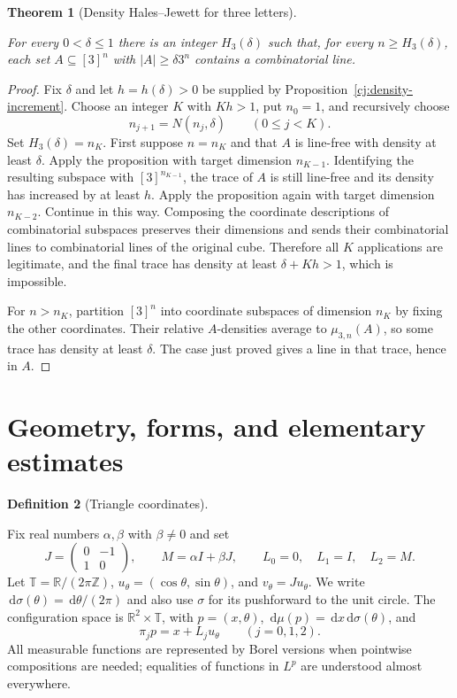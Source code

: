 \documentclass[11pt]{amsart}
\newcommand{\R}{\mathbb R}
\newcommand{\Z}{\mathbb Z}
\newcommand{\dd}{\,\mathrm d}
\newtheorem{theorem}{Theorem}[section]
\theoremstyle{definition}
\newtheorem{definition}[theorem]{Definition}
\theoremstyle{remark}
\numberwithin{equation}{section}
\providecommand{\lean}[1]{}
\providecommand{\leanok}{}
\begin{document}
\begin{theorem}[Density Hales--Jewett for three letters]\label{cj:dhj3}
\lean{Auto.cj_dhj3}
\leanok
For every $0<\delta\le1$ there is an integer $H_3(\delta)$ such
that, for every $n\ge H_3(\delta)$, each set $A\subseteq[3]^n$
with $|A|\ge\delta3^n$ contains a combinatorial line.
\end{theorem}
\begin{proof}
Fix $\delta$ and let $h=h(\delta)>0$ be supplied by
Proposition~\ref{cj:density-increment}.  Choose an integer $K$
with $Kh>1$, put $n_0=1$, and recursively choose
\[
 n_{j+1}=N(n_j,\delta)\qquad(0\le j<K).
\]
Set $H_3(\delta)=n_K$.  First suppose $n=n_K$ and that $A$ is
line-free with density at least $\delta$.  Apply the proposition
with target dimension $n_{K-1}$.  Identifying the resulting
subspace with $[3]^{n_{K-1}}$, the trace of $A$ is still line-free
and its density has increased by at least $h$.  Apply the
proposition again with target dimension $n_{K-2}$.  Continue in
this way.  Composing the coordinate descriptions of combinatorial
subspaces preserves their dimensions and sends their combinatorial
lines to combinatorial lines of the original cube.  Therefore all
$K$ applications are legitimate, and the final trace has density
at least $\delta+Kh>1$, which is impossible.

For $n>n_K$, partition $[3]^n$ into coordinate subspaces of
dimension $n_K$ by fixing the other coordinates.  Their relative
$A$-densities average to $\mu_{3,n}(A)$, so some trace has density
at least $\delta$.  The case just proved gives a line in that
trace, hence in $A$.
\end{proof}


\section{Geometry, forms, and elementary estimates}\label{sec:prelim}

\begin{definition}[Triangle coordinates]\label{def:geometry}
\lean{Auto.J,Auto.M,Auto.Lv,Auto.Ang,Auto.u,Auto.v,Auto.σ,Auto.μinc,Auto.proj,Auto.FCMeasure.sigma}
Fix real numbers $\alpha,\beta$ with $\beta\ne0$ and set
\[
 J=\begin{pmatrix}0&-1\\1&0\end{pmatrix},\qquad
 M=\alpha I+\beta J,\qquad
 L_0=0,\quad L_1=I,\quad L_2=M.
\]
Let $\mathbb T=\R/(2\pi\Z)$,
$u_\theta=(\cos\theta,\sin\theta)$, and $v_\theta=Ju_\theta$.
We write $\dd\sigma(\theta)=\dd\theta/(2\pi)$ and also use
$\sigma$ for its pushforward to the unit circle.
The configuration space is $\R^2\times\mathbb T$, with
$p=(x,\theta)$, $\dd\mu(p)=\dd x\dd\sigma(\theta)$, and
\[
 \pi_jp=x+L_ju_\theta\qquad(j=0,1,2).
\]
All measurable functions are represented by Borel versions when
pointwise compositions are needed; equalities of functions in
$L^p$ are understood almost everywhere.
\end{definition}
\end{document}
